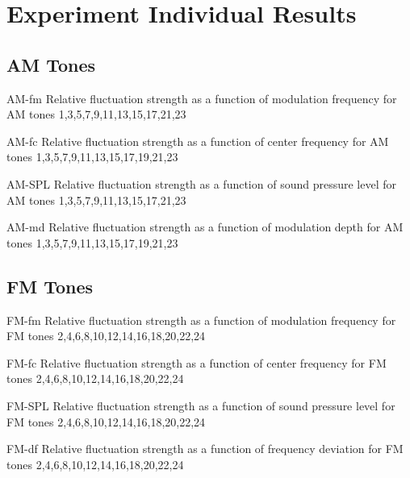 \documentclass[../main.tex]{subfiles}
\begin{document}
\chapter{Experiment Individual Results}

\begin{experimentalresults}

\section{AM Tones}

  {AM-fm}
  {Relative fluctuation strength as a function of modulation frequency for AM
  tones}
  {1,3,5,7,9,11,13,15,17,21,23}

  {AM-fc}
  {Relative fluctuation strength as a function of center frequency for AM
  tones}
  {1,3,5,7,9,11,13,15,17,19,21,23}

  {AM-SPL}
  {Relative fluctuation strength as a function of sound pressure level for AM
  tones}
  {1,3,5,7,9,11,13,15,17,21,23}

  {AM-md}
  {Relative fluctuation strength as a function of modulation depth for AM
  tones}
  {1,3,5,7,9,11,13,15,17,19,21,23}

\section{FM Tones}

  {FM-fm}
  {Relative fluctuation strength as a function of modulation frequency for FM
  tones}
  {2,4,6,8,10,12,14,16,18,20,22,24}

  {FM-fc}
  {Relative fluctuation strength as a function of center frequency for FM
  tones}
  {2,4,6,8,10,12,14,16,18,20,22,24}

  {FM-SPL}
  {Relative fluctuation strength as a function of sound pressure level for FM
  tones}
  {2,4,6,8,10,12,14,16,18,20,22,24}

  {FM-df}
  {Relative fluctuation strength as a function of frequency deviation for FM
  tones}
  {2,4,6,8,10,12,14,16,18,20,22,24}

\end{experimentalresults}
\end{document}
